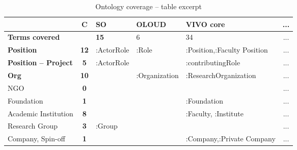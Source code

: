 
\begin{table}[H]
\centering
\scriptsize
\caption{Ontology coverage -- table excerpt}
\label{tab:coverage}
\begin{tabular}{|p{2.8cm}|c|p{2.6cm}|p{2.2cm}|p{3cm}|c|}
\hline
\textbf{}                   & \textbf{C}                       & \textbf{SO}                                 & \textbf{OLOUD}            & \textbf{VIVO core}                                & ... \\ \hline
\textbf{Terms covered}      &                                    & \cellcolor[HTML]{D6DF82}\textbf{15}         & \cellcolor[HTML]{FDC57C}6 & \cellcolor[HTML]{63BE7B}34                        & ... \\ \hline
\textbf{Position}           & \cellcolor[HTML]{BDD881}\textbf{12} & :ActorRole                                  & :Role                     & :Position,\newline :Faculty Position                       & ... \\ \hline
\textbf{Position -- Project} & \cellcolor[HTML]{FFEB84}\textbf{5} & :ActorRole                                  &                           & :contributingRole                                 & ... \\ \hline \hline
\textbf{Org}               & \cellcolor[HTML]{90CB7E}\textbf{10} &                                             & :Organization             & :ResearchOrganization                             & ... \\ \hline
NGO                         & \cellcolor[HTML]{F8696B}\textbf{0} &                                             &                           &                                                   & ... \\ \hline
Foundation                  & \cellcolor[HTML]{F98971}\textbf{1} &                                             &                           & :Foundation                                       & ... \\ \hline
Academic Institution        & \cellcolor[HTML]{E9E583}\textbf{8} &                                             &                           & :Faculty, :Institute                              & ... \\ \hline
Research Group              & \cellcolor[HTML]{FBAA77}\textbf{3} & :Group                                      &                           &                                                   & ... \\ \hline
Company, Spin-off           & \cellcolor[HTML]{F98971}\textbf{1} &                                             &                           & :Company,\newline :Private Company                         & ... \\ \hline

\end{tabular}
\end{table}

